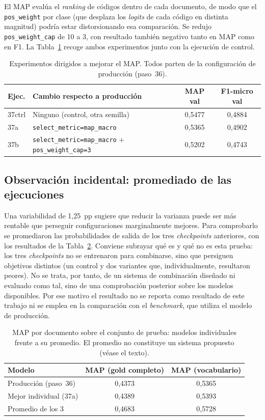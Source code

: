 El MAP evalúa el \emph{ranking} de códigos dentro de cada documento, de modo que el \texttt{pos\_weight} por clase (que desplaza los \emph{logits} de cada código en distinta magnitud) podría estar distorsionando esa comparación. Se redujo \texttt{pos\_weight\_cap} de 10 a 3, con resultado también negativo tanto en MAP como en F1. La Tabla~\ref{tab:map-experiments} recoge ambos experimentos junto con la ejecución de control.

\begin{table}[h]
\centering
\caption{Experimentos dirigidos a mejorar el MAP. Todos parten de la configuración de producción (paso~36).}
\label{tab:map-experiments}
\begin{tabular}{llcc}
\hline
\textbf{Ejec.} & \textbf{Cambio respecto a producción} & \textbf{MAP val} & \textbf{F1-micro val} \\
\hline
37ctrl & Ninguno (control, otra semilla) & 0{,}5477 & 0{,}4884 \\
37a & \texttt{select\_metric=map\_macro} & 0{,}5365 & 0{,}4902 \\
37b & \texttt{select\_metric=map\_macro} + \texttt{pos\_weight\_cap=3} & 0{,}5202 & 0{,}4743 \\
\hline
\end{tabular}
\end{table}

\subsection{Observación incidental: promediado de las ejecuciones}

Una variabilidad de 1{,}25~pp sugiere que reducir la varianza puede ser más rentable que perseguir configuraciones marginalmente mejores. Para comprobarlo se promediaron las probabilidades de salida de los tres \emph{checkpoints} anteriores, con los resultados de la Tabla~\ref{tab:map-ensemble}. Conviene subrayar qué es y qué no es esta prueba: los tres \emph{checkpoints} no se entrenaron para combinarse, sino que persiguen objetivos distintos (un control y dos variantes que, individualmente, resultaron peores). No se trata, por tanto, de un sistema de combinación diseñado ni evaluado como tal, sino de una comprobación posterior sobre los modelos disponibles. Por ese motivo el resultado no se reporta como resultado de este trabajo ni se emplea en la comparación con el \emph{benchmark}, que utiliza el modelo de producción.

\begin{table}[h]
\centering
\caption{MAP por documento sobre el conjunto de prueba: modelos individuales frente a su promedio. El promedio no constituye un sistema propuesto (véase el texto).}
\label{tab:map-ensemble}
\begin{tabular}{lcc}
\hline
\textbf{Modelo} & \textbf{MAP (gold completo)} & \textbf{MAP (vocabulario)} \\
\hline
Producción (paso~36) & 0{,}4373 & 0{,}5365 \\
Mejor individual (37a) & 0{,}4389 & 0{,}5393 \\
Promedio de los 3 & 0{,}4683 & 0{,}5728 \\
\hline
\end{tabular}
\end{table}

